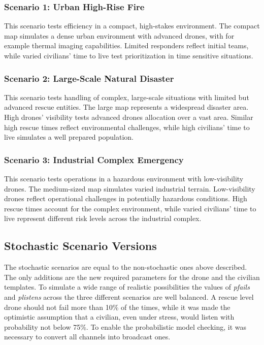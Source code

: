 \subsubsection{Scenario 1: Urban High-Rise Fire}
This scenario tests efficiency in a compact, high-stakes environment. The compact map simulates a dense urban environment with advanced drones, with for example thermal imaging capabilities. Limited responders reflect initial teams, while varied civilians’ time to live test prioritization in time sensitive situations.
\subsubsection{Scenario 2: Large-Scale Natural Disaster}
This scenario tests handling of complex, large-scale situations with limited but advanced rescue entities. The large map represents a widespread disaster area. High drones’ visibility tests advanced drones allocation over a vast area. Similar high rescue times reflect environmental challenges, while high civilians’ time to live simulates a well prepared population.
\subsubsection{Scenario 3: Industrial Complex Emergency}
This scenario tests operations in a hazardous environment with low-visibility drones. The medium-sized map simulates varied industrial terrain. Low-visibility drones reflect operational challenges in potentially hazardous conditions. High rescue times account for the complex environment, while varied civilians’ time to live represent different risk levels across the industrial complex.

\subsection{Stochastic Scenario Versions}
The stochastic scenarios are equal to the non-stochastic ones above described. The only additions are the new required parameters for the drone and the civilian templates. To simulate a wide range of realistic possibilities the values of \textit{pfails} and \textit{plistens} across the three different scenarios are well balanced. A rescue level drone should not fail more than 10\% of the times, while it was made the optimistic assumption that a civilian, even under stress, would listen with probability not below 75\%.\newline
To enable the probabilistic model checking, it was necessary to convert all channels into broadcast ones.

